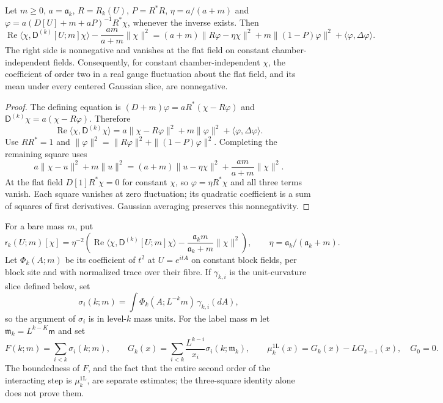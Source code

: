 \documentclass[11pt,letterpaper,reqno]{amsart}
\makeatletter
\theoremstyle{definition}
\newcommand{\ms@minorstart}{%
  \pushQED{\qed}\renewcommand{\qedsymbol}{$\blacksquare$}}
\newenvironment{lemma}[1][]{\ms@minorstart\ms@lemma[#1]}
  {\popQED\endms@lemma}
\theoremstyle{remark}
\makeatother
\begin{document}
\begin{lemma}[The three-square identity]\label{C-398-4}
Let $m\ge0$, $a=\mathfrak a_k$, $R=R_k(U)$, $P=R^*R$,
$\eta=a/(a+m)$ and
$\varphi=a(D[U]+m+aP)^{-1}R^*\chi$, whenever the inverse exists.
Then
\[
 \operatorname{Re}\langle\chi,\mathsf D^{(k)}[U;m]\chi\rangle
 -\frac{am}{a+m}\|\chi\|^2
 =(a+m)\|R\varphi-\eta\chi\|^2+
     m\|(1-P)\varphi\|^2+\langle\varphi,\Delta\varphi\rangle.
\]
The right side is nonnegative and vanishes at the flat field on
constant chamber-independent fields. Consequently, for constant
chamber-independent $\chi$, the coefficient of order two in a
real gauge fluctuation about the flat field, and its mean under
every centered Gaussian slice, are nonnegative.
\end{lemma}

\begin{proof}
The defining equation is
$(D+m)\varphi=aR^*(\chi-R\varphi)$ and
$\mathsf D^{(k)}\chi=a(\chi-R\varphi)$.  Therefore
\[
 \operatorname{Re}\langle\chi,\mathsf D^{(k)}\chi\rangle
 =a\|\chi-R\varphi\|^2+
             m\|\varphi\|^2+\langle\varphi,\Delta\varphi\rangle.
\]
Use $RR^*=1$ and
$\|\varphi\|^2=\|R\varphi\|^2+\|(1-P)\varphi\|^2$.
Completing the remaining square uses
\[
 a\|\chi-u\|^2+m\|u\|^2
 =(a+m)\|u-\eta\chi\|^2+\frac{am}{a+m}\|\chi\|^2.
\]
At the flat field $D[1]R^*\chi=0$ for constant $\chi$, so
$\varphi=\eta R^*\chi$ and all three terms vanish.  Each square
vanishes at zero fluctuation; its quadratic coefficient is a sum of
squares of first derivatives.  Gaussian averaging preserves this
nonnegativity.
\end{proof}

For a bare mass $m$, put
\[
 \mathsf r_k(U;m)[\chi]=\eta^{-2}
 \left(\operatorname{Re}\langle\chi,
             \mathsf D^{(k)}[U;m]\chi\rangle
            -\frac{\mathfrak a_km}{\mathfrak a_k+m}\|\chi\|^2\right),
 \qquad\eta=\mathfrak a_k/(\mathfrak a_k+m).
\]
Let $\Phi_k(A;m)$ be its coefficient of $t^2$ at $U=e^{itA}$
on constant block fields, per block site and with normalized
trace over their fibre.  If $\gamma_{k,i}$ is the unit-curvature
slice defined below, set
\[
 \sigma_i(k;m)=\int\Phi_k(A;L^{-k}m)\,\gamma_{k,i}(dA),
\]
so the argument of $\sigma_i$ is in level-$k$ mass units.
For the label mass $\mathsf m$ let
$\mathfrak m_k=L^{k-K}\mathsf m$ and set
\[
 F(k;m)=\sum_{i<k}\sigma_i(k;m),\qquad
 G_k(x)=\sum_{i<k}\frac{L^{k-i}}{x_i}
                         \sigma_i(k;\mathfrak m_k),\qquad
 \mu_k^{\mathrm{1L}}(x)=G_k(x)-LG_{k-1}(x),\quad G_0=0.
\]
The boundedness of $F$, and the fact that the entire second order of
the interacting step is $\mu_k^{\mathrm{1L}}$, are separate estimates;
the three-square identity alone does not prove them.
\end{document}
